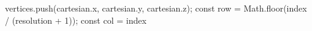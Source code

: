vertices.push(cartesian.x, cartesian.y, cartesian.z); const row = Math.floor(index / (resolution + 1)); const col = index %